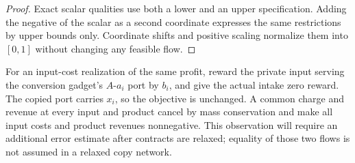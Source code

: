 \begin{proof}
Exact scalar qualities use both a lower and an upper specification.
Adding the negative of the scalar as a second coordinate expresses the
same restrictions by upper bounds only. Coordinate shifts and positive
scaling normalize them into $[0,1]$ without changing any feasible flow.
\end{proof}

For an input-cost realization of the same profit, reward the private
input serving the conversion gadget's $A$-$a_i$ port by $b_i$, and give
the actual intake zero reward. The copied port carries $x_i$, so the
objective is unchanged. A common charge and revenue at every input and
product cancel by mass conservation and make all input costs and product
revenues nonnegative. This observation will require an additional error
estimate after contracts are relaxed; equality of those two flows is
not assumed in a relaxed copy network.

